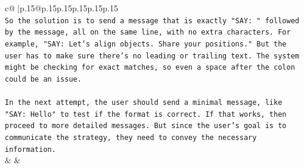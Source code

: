 \documentclass{article}
\begin{document}
{\begin{supertabular}{c@{$\;$}|p{.15\linewidth}@{}p{.15\linewidth}p{.15\linewidth}p{.15\linewidth}p{.15\linewidth}p{.15\linewidth}}
{{{\\ 
\texttt{So the solution is to send a message that is exactly "SAY: " followed by the message, all on the same line, with no extra characters. For example, "SAY: Let's align objects. Share your positions." But the user has to make sure there's no leading or trailing text. The system might be checking for exact matches, so even a space after the colon could be an issue.} \\
\\ 
\texttt{In the next attempt, the user should send a minimal message, like "SAY: Hello" to test if the format is correct. If that works, then proceed to more detailed messages. But since the user's goal is to communicate the strategy, they need to convey the necessary information.} \\
            }
        }
    }
    & & \\ \\


\end{supertabular}}
\end{document}
